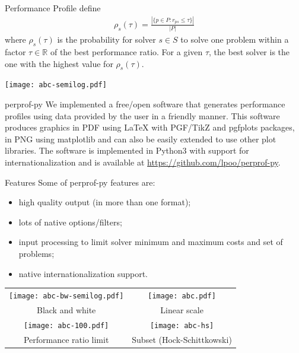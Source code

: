 \documentclass[a0paper,portrait]{baposter}
\begin{document}
\begin{poster}
\begin{posterbox}[column=0,below=auto]{Performance Profile}
    \textcite{Dolan2002} define
    \begin{align*}
      \rho_s(\tau) = \frac{| \{p \in P: r_{ps} \leq \tau\} |}{| P |}
    \end{align*}
    where $\rho_s(\tau)$ is the probability for solver $s \in S$ to solve one
    problem within a factor $\tau \in \mathbb{R}$ of the best performance
    ratio. For a given $\tau$, the best solver is the one with the highest
    value for $\rho_s(\tau)$.

    \texttt{[image: abc-semilog.pdf]}
  \end{posterbox}

  \begin{posterbox}[column=0,below=auto,name=perprof]{perprof-py}
    We implemented a free/open software that generates performance profiles using data
    provided by the user in a friendly manner. This software produces graphics in PDF
    using LaTeX with PGF/TikZ and pgfplots packages,
    in PNG using matplotlib and can also be easily extended to
    use other plot libraries. The software is implemented in Python3 with
    support for internationalization and is available at
    \url{https://github.com/lpoo/perprof-py}.
  \end{posterbox}

  \begin{posterbox}[column=1]{Features}
    Some of perprof-py features are:
    \begin{itemize}[noitemsep]
      \item high quality output (in more than one format);
      \item lots of native options/filters;
      \item input processing to limit solver minimum and maximum costs and set
        of problems;
      \item native internationalization support.
    \end{itemize}

    \begin{center}
      \begin{tabular}{cc}
        \texttt{[image: abc-bw-semilog.pdf]} &
        \texttt{[image: abc.pdf]} \\
        Black and white & Linear scale \\
        \texttt{[image: abc-100.pdf]} &
        \texttt{[image: abc-hs]} \\
        Performance ratio limit & Subset (Hock-Schittkowski)
      \end{tabular}
    \end{center}


\end{posterbox}
\end{poster}
\end{document}
